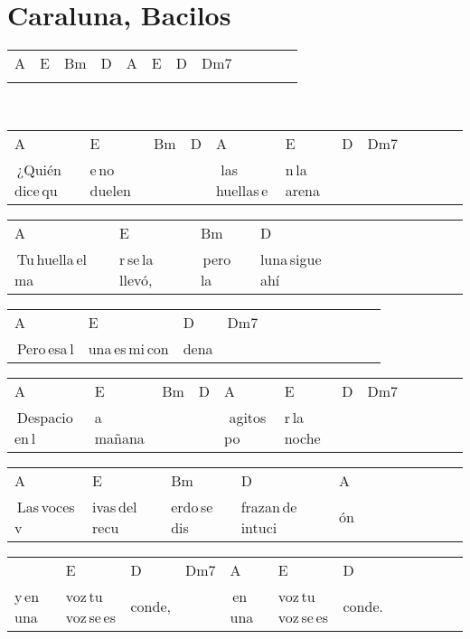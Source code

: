 \section*{Caraluna, Bacilos\hfill}
\begin{multicols}{2}
\noindent
\begin{minipage}{\columnwidth}
\noindent
\noindent
\begin{tabular}{llllllllllll}
A&E&Bm&D&A&E&D&Dm7\\
\quad\quad\quad&\quad\quad\quad&\quad\quad\quad&\quad\quad\quad&\quad\quad\quad&\quad\quad\quad&\quad\quad\quad&
\end{tabular}
\end{minipage}\\

\noindent
\begin{minipage}{\columnwidth}
\noindent
\noindent
\begin{tabular}{llllllllllll}
A&E&Bm&D&A&E&D&Dm7\\
\,¿Quién\,dice\,qu&e\,no\,duelen&\quad\,\,\,\,\,&\quad\,&\,\,las\,huellas\,e&n\,la\,arena&\quad\,&
\end{tabular}

\noindent
\begin{tabular}{llllllllllll}
A&E&Bm&D\\
\,Tu\,huella\,el\,ma&r\,se\,la\,llevó,&\quad\,pero\,la\,&luna\,sigue\,ahí
\end{tabular}

\noindent
\begin{tabular}{llllllllllll}
A&E&D&Dm7\\
\,Pero\,esa\,l&una\,es\,mi\,con&dena\quad&
\end{tabular}

\noindent
\begin{tabular}{llllllllllll}
A&E&Bm&D&A&E&D&Dm7\\
\,Despacio\,en\,l&a\,mañana&\quad\,\,\,\,\,&\quad\,&\,\,agitos\,po&r\,la\,noche&\quad\,&
\end{tabular}

\noindent
\begin{tabular}{llllllllllll}
A&E&Bm&D&A\\
\,Las\,voces\,v&ivas\,del\,recu&erdo\,se\,dis&frazan\,de\,intuci&ón
\end{tabular}

\noindent
\begin{tabular}{llllllllllll}
&E&D&Dm7&A&E&D\\
y\,en\,una\,&voz\,tu\,voz\,se\,es&conde,\quad&\qquad\,\,&\,en\,una\,&voz\,tu\,voz\,se\,es&conde.
\end{tabular}
\end{minipage}\\


\end{multicols}
